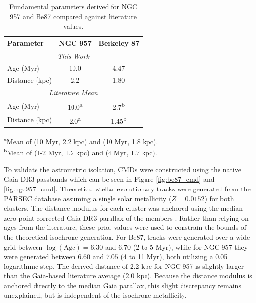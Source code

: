 \documentclass{CU_IOPStyle_PXT999}
\begin{document}
\begin{table}[h]
    \centering
    \caption{Fundamental parameters derived for NGC 957 and Be87 compared against literature values.}
    \vspace{0.2cm}
    \begin{tabular}{lcc}
        \hline\hline
        Parameter & NGC 957 & Berkeley 87 \\
        \hline
        \multicolumn{3}{c}{\textit{This Work}} \\
        \hline
        Age (Myr) & 10.0 & 4.47 \\
        Distance (kpc) & 2.2 & 1.80 \\
        \hline
        \multicolumn{3}{c}{\textit{Literature Mean}} \\
        \hline
        Age (Myr) & 10.0\textsuperscript{a} & 2.7\textsuperscript{b} \\
        Distance (kpc) & 2.0\textsuperscript{a} & 1.45\textsuperscript{b} \\
        \hline\hline
    \end{tabular}
    \label{tab:fundamental_parameters}
    \vspace{1ex}
    
    {\footnotesize 
    \textsuperscript{a}Mean of \cite{yadav_optical_2008} (10 Myr, 2.2 kpc) and \cite{cantat-gaudin_painting_2020} (10 Myr, 1.8 kpc).\\
    \textsuperscript{b}Mean of \cite{turner_berkeley_1982} (1-2 Myr, 1.2 kpc) and \cite{cantat-gaudin_painting_2020} (4 Myr, 1.7 kpc).}
\end{table}

To validate the astrometric isolation, CMDs were constructed using the native Gaia DR3 passbands which can be seen in Figure \ref{fig:be87_cmd} and \ref{fig:ngc957_cmd}. Theoretical stellar evolutionary tracks were generated from the PARSEC database \cite{bressan_span_2012} assuming a single solar metallicity ($Z=0.0152$) for both clusters. The distance modulus for each cluster was anchored using the median zero-point-corrected Gaia DR3 parallax of the members \cite{lindegren_2021}. Rather than relying on ages from the literature, these prior values were used to constrain the bounds of the theoretical isochrone generation. For Be87, tracks were generated over a wide grid between $\log(\text{Age}) = 6.30$ and $6.70$ (2 to 5 Myr), while for NGC 957 they were generated between $6.60$ and $7.05$ (4 to 11 Myr), both utilizing a 0.05 logarithmic step. The derived distance of 2.2 kpc for NGC 957 is slightly larger than the Gaia-based literature average (2.0 kpc). Because the distance modulus is anchored directly to the median Gaia parallax,  this slight discrepancy remains unexplained, but is independent of the isochrone metallicity.
\end{document}
